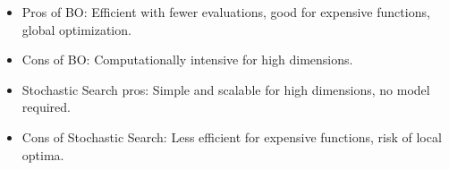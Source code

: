 \begin{enumerate}
\begin{itemize}
\item Pros of BO: Efficient with fewer evaluations, good for expensive functions, global 
optimization.
\item Cons of BO: Computationally intensive for high dimensions.
\item Stochastic Search pros: Simple and scalable for high dimensions, no model required.
\item Cons of Stochastic Search: Less efficient for expensive functions, risk of local optima.
\end{itemize}
\end{enumerate}




